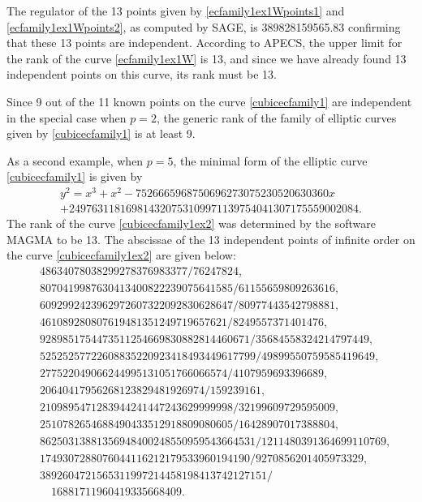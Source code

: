 \documentclass[11pt, leqno]{article}
\begin{document}
The regulator of the 13 points given by \eqref{ecfamily1ex1Wpoints1} and \eqref{ecfamily1ex1Wpoints2}, as computed by SAGE, is 389828159565.83 confirming that these 13 points are independent. According to APECS, the upper limit for the rank of the curve \eqref{ecfamily1ex1W} is 13, and since we have already found 13 independent points on this curve, its rank must be 13.

Since   9 out of the 11 known  points on the curve \eqref{cubicecfamily1} are independent in the special case when $p=2$,  the generic rank of the family of elliptic curves given  by  \eqref{cubicecfamily1} is at least 9. 

As a second example,  when $p=5$, the minimal form of the elliptic curve \eqref{cubicecfamily1} is given by
\begin{multline}
y^2=x^3+x^2-7526665968750696273075230520630360x\\
+249763118169814320753109971139754041307175559002084. \label{cubicecfamily1ex2}
\end{multline}
The rank of the curve \eqref{cubicecfamily1ex2} was determined by the software MAGMA to be 13. The abscissae of the 13 independent points of infinite order on the curve \eqref{cubicecfamily1ex2} are given below:
\begin{equation*}
\begin{aligned}
&48634078038299278376983377/76247824,\\&
8070419987630413400822239075641585/61155659809263616,\\&
6092992423962972607322092830628647/80977443542798881,\\&
461089280807619481351249719657621/8249557371401476,\\&
9289851754473511254669830882814460671/35684558324214797449,\\&
52525257722608835220923418493449617799/49899550759585419649,\\&
277522049066244995131051766066574/4107959693396689,\\&
20640417956268123829481926974/159239161,\\&
2109895471283944241447243629999998/32199609729595009,\\&
2510782654688490433512918809080605/16428907017388804,\\&
86250313881356948400248550959543664531/1211480391364699110769,\\&
1749307288076044116212179533960194190/9270856201405973329,\\&
3892604721565311997214458198413742127151/  \\
& \quad 16881711960419335668409.
\end{aligned}
\end{equation*}
\end{document}
